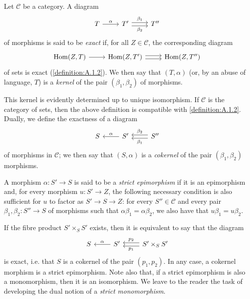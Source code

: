 \documentclass{article}
\theoremstyle{plain}
\theoremstyle{definition}
\newenvironment{definition}[1]
  {\renewcommand\theinnercustomdefinition{#1}\innercustomdefinition}
  {\endinnercustomdefinition}
\newcommand{\cat}[1]{{\mathcal{#1}}}
\DeclareMathOperator{\Hom}{Hom}
\newcommand{\oldpage}[1]{\marginpar{\footnotesize$\Big\vert$ \textit{p.~#1}}}
\begin{document}
\subsection{}
\label{A.2.a}

\begin{definition}{2.1}
\label{definition:A.2.1}
  Let $\cat{C}$ be a category.
  A diagram
  \[
    \begin{tikzcd}
      T \rar["\alpha"]
      & T' \rar[shift left=1,"\beta_1"] \rar[shift right=1,swap,"\beta_2"]
      & T''
    \end{tikzcd}
  \]
  of morphisms is said to be \emph{exact} if, for all $Z\in\cat{C}$, the corresponding diagram
  \[
    \begin{tikzcd}
      \Hom(Z,T) \rar
      & \Hom(Z,T') \rar[shift left=1] \rar[shift right=1]
      & \Hom(Z,T'')
    \end{tikzcd}
  \]
  of sets is exact (\cref{definition:A.1.2}).
  We then say that $(T,\alpha)$ (or, by an abuse of language, $T$) is a \emph{kernel} of the pair $(\beta_1,\beta_2)$ of morphisms.
\end{definition}

This kernel is evidently determined up to unique isomorphism.
If $\cat{C}$ is the category of sets, then the above definition is compatible with \cref{definition:A.1.2}.
Dually, we define the exactness of a diagram
\[
  \begin{tikzcd}
    S
    & S' \lar[swap,"\alpha"]
    & S''\lar[shift left=1,"\beta_1"] \lar[shift right=1,swap,"\beta_2"]
  \end{tikzcd}
\]
of morphisms in $\cat{C}$;
we then say that $(S,\alpha)$ is a \emph{cokernel} of the pair $(\beta_1,\beta_2)$ morphisms.

\begin{definition}{2.2}
\label{definition:A.2.2}
  A morphism $\alpha\colon S'\to S$ is said to be a \emph{strict epimorphism} if it is an epimorphism and, for every morphism $u\colon S'\to Z$, the following necessary condition is also sufficient for $u$ to factor as $S'\to S\to Z$:
  for every $S''\in\cat{C}$ and every pair $\beta_1,\beta_2\colon S''\to S$ of morphisms such that $\alpha\beta_1=\alpha\beta_2$, we also have that $u\beta_1=u\beta_2$.
\end{definition}

If the fibre product $S'\times_S S'$ exists, then it is equivalent to say that the diagram
\[
  \begin{tikzcd}
    S
    & S' \lar[swap,"\alpha"]
    & S'\times_S S'\lar[shift left=1,"p_1"] \lar[shift right=1,swap,"p_2"]
  \end{tikzcd}
\]
\oldpage{190-07}
is exact, i.e. that $S$ is a cokernel of the pair $(p_1,p_2)$.
In any case, a cokernel morphism is a strict epimorphism.
Note also that, if a strict epimorphism is also a monomorphism, then it is an isomorphism.
We leave to the reader the task of developing the dual notion of a \emph{strict monomorphism}.
\end{document}
